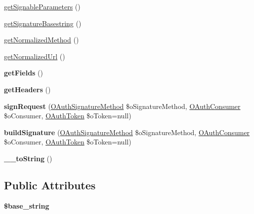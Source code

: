 \begin{DoxyCompactItemize}
\item 
\hyperlink{class_o_auth_request_a53f77924cbac7178af497688441a11bd}{get\-Signable\-Parameters} ()
\item 
\hyperlink{class_o_auth_request_aa8b1ab5e4e72fdd84eaf0b453c3f07d5}{get\-Signature\-Basestring} ()
\item 
\hyperlink{class_o_auth_request_a9431f4b1531ab494c4c2548be606cbcf}{get\-Normalized\-Method} ()
\item 
\hyperlink{class_o_auth_request_a7cc129ca754d1b8a93b5ec39ab311f74}{get\-Normalized\-Url} ()
\item 
\hypertarget{class_o_auth_request_ac9a215a78c7d605f33a82a48901b5a2a}{{\bfseries get\-Fields} ()}\label{class_o_auth_request_ac9a215a78c7d605f33a82a48901b5a2a}

\item 
\hypertarget{class_o_auth_request_ac11983e7c7c5db646ce226a101641f07}{{\bfseries get\-Headers} ()}\label{class_o_auth_request_ac11983e7c7c5db646ce226a101641f07}

\item 
\hypertarget{class_o_auth_request_a843969ed80f37f0eb3a10fb83ef9bd05}{{\bfseries sign\-Request} (\hyperlink{class_o_auth_signature_method}{O\-Auth\-Signature\-Method} \$o\-Signature\-Method, \hyperlink{class_o_auth_consumer}{O\-Auth\-Consumer} \$o\-Consumer, \hyperlink{class_o_auth_token}{O\-Auth\-Token} \$o\-Token=null)}\label{class_o_auth_request_a843969ed80f37f0eb3a10fb83ef9bd05}

\item 
\hypertarget{class_o_auth_request_a5c2ca046dfaafbd4bb2d4b3ab29a092b}{{\bfseries build\-Signature} (\hyperlink{class_o_auth_signature_method}{O\-Auth\-Signature\-Method} \$o\-Signature\-Method, \hyperlink{class_o_auth_consumer}{O\-Auth\-Consumer} \$o\-Consumer, \hyperlink{class_o_auth_token}{O\-Auth\-Token} \$o\-Token=null)}\label{class_o_auth_request_a5c2ca046dfaafbd4bb2d4b3ab29a092b}

\item 
\hypertarget{class_o_auth_request_a28fea7b75af1500bad2d35f88e77c0dd}{{\bfseries \-\_\-\-\_\-to\-String} ()}\label{class_o_auth_request_a28fea7b75af1500bad2d35f88e77c0dd}

\end{DoxyCompactItemize}
\subsection*{Public Attributes}
\begin{DoxyCompactItemize}
\item 
\hypertarget{class_o_auth_request_ae7d34c4f1965452e48fae7dd1c07305e}{{\bfseries \$base\-\_\-string}}\label{class_o_auth_request_ae7d34c4f1965452e48fae7dd1c07305e}

\end{DoxyCompactItemize}
